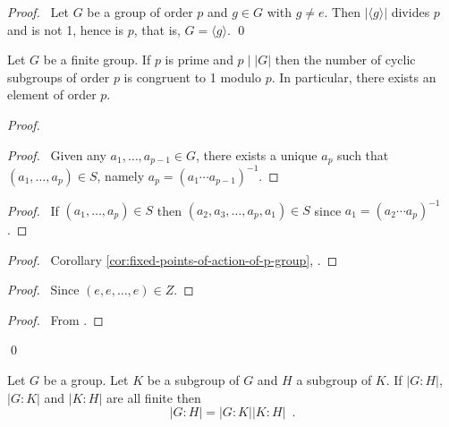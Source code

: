 \begin{proof}
\pf\ Let $G$ be a group of order $p$ and $g \in G$ with $g \neq e$. Then $|\langle g \rangle|$ divides $p$ and is not 1, hence is $p$, that is, $G = \langle g \rangle$. \qed
\end{proof}

\begin{thm}
Let $G$ be a finite group. If $p$ is prime and $p \mid |G|$ then the number of cyclic subgroups of order $p$ is congruent to 1 modulo $p$. In particular, there exists an element of order $p$.
\end{thm}

\begin{proof}
\pf
{}
\begin{proof}
	\pf\ Given any $a_1, \ldots, a_{p-1} \in G$, there exists a unique $a_p$ such that $(a_1, \ldots, a_p) \in S$, namely $a_p = (a_1 \cdots a_{p-1})^{-1}$.
\end{proof}
\begin{proof}
	\pf\ If $(a_1, \ldots, a_p) \in S$ then $(a_2, a_3, \ldots, a_p, a_1) \in S$ since $a_1 = (a_2 \cdots a_p)^{-1}$.
\end{proof}
\begin{proof}
	\pf\ Corollary \ref{cor:fixed-points-of-action-of-p-group}, .
\end{proof}
\begin{proof}
	\pf\ Since $(e, e, \ldots, e) \in Z$.
\end{proof}
\begin{proof}
	\pf\ From .
\end{proof}
\qed
\end{proof}

\begin{prop}
Let $G$ be a group. Let $K$ be a subgroup of $G$ and $H$ a subgroup of $K$. If $|G:H|$, $|G:K|$ and $|K:H|$ are all finite then
\[ |G:H| = |G:K| |K:H| \enspace . \]
\end{prop}

